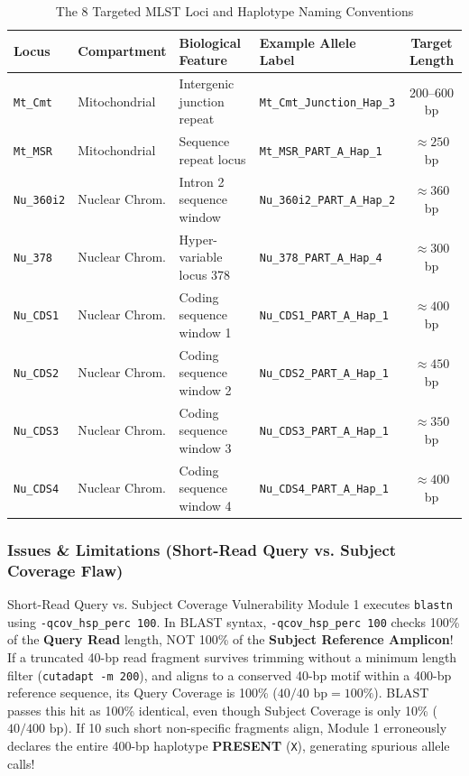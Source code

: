 \documentclass[11pt,a4paper]{article}
\begin{document}
\begin{table}[h]
\centering
\small
\caption{The 8 Targeted MLST Loci and Haplotype Naming Conventions}
\label{tab:loci}
\begin{tabularx}{\textwidth}{l p{2.8cm} p{3.2cm} p{4.2cm} c}
\toprule
\textbf{Locus} & \textbf{Compartment} & \textbf{Biological Feature} & \textbf{Example Allele Label} & \textbf{Target Length} \\
\midrule
\texttt{Mt\_Cmt} & Mitochondrial & Intergenic junction repeat & \texttt{\small Mt\_Cmt\_Junction\_Hap\_3} & 200--600 bp \\
\texttt{Mt\_MSR} & Mitochondrial & Sequence repeat locus & \texttt{\small Mt\_MSR\_PART\_A\_Hap\_1} & $\approx 250$ bp \\
\texttt{Nu\_360i2} & Nuclear Chrom. & Intron 2 sequence window & \texttt{\small Nu\_360i2\_PART\_A\_Hap\_2} & $\approx 360$ bp \\
\texttt{Nu\_378} & Nuclear Chrom. & Hyper-variable locus 378 & \texttt{\small Nu\_378\_PART\_A\_Hap\_4} & $\approx 300$ bp \\
\texttt{Nu\_CDS1} & Nuclear Chrom. & Coding sequence window 1 & \texttt{\small Nu\_CDS1\_PART\_A\_Hap\_1} & $\approx 400$ bp \\
\texttt{Nu\_CDS2} & Nuclear Chrom. & Coding sequence window 2 & \texttt{\small Nu\_CDS2\_PART\_A\_Hap\_1} & $\approx 450$ bp \\
\texttt{Nu\_CDS3} & Nuclear Chrom. & Coding sequence window 3 & \texttt{\small Nu\_CDS3\_PART\_A\_Hap\_1} & $\approx 350$ bp \\
\texttt{Nu\_CDS4} & Nuclear Chrom. & Coding sequence window 4 & \texttt{\small Nu\_CDS4\_PART\_A\_Hap\_1} & $\approx 400$ bp \\
\bottomrule
\end{tabularx}
\end{table}

\subsubsection{Issues \& Limitations (Short-Read Query vs. Subject Coverage Flaw)}
\begin{warningbox}{Short-Read Query vs. Subject Coverage Vulnerability}
Module 1 executes \texttt{blastn} using \texttt{-qcov\_hsp\_perc 100}. In BLAST syntax, \texttt{-qcov\_hsp\_perc 100} checks 100\% of the \textbf{Query Read} length, NOT 100\% of the \textbf{Subject Reference Amplicon}! \\
If a truncated 40-bp read fragment survives trimming without a minimum length filter (\texttt{cutadapt -m 200}), and aligns to a conserved 40-bp motif within a 400-bp reference sequence, its Query Coverage is 100\% ($40/40\text{ bp} = 100\%$). BLAST passes this hit as 100\% identical, even though Subject Coverage is only 10\% ($40/400\text{ bp}$). If 10 such short non-specific fragments align, Module 1 erroneously declares the entire 400-bp haplotype \textbf{PRESENT} (\texttt{X}), generating spurious allele calls!
\end{warningbox}
\end{document}
